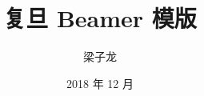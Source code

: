 \documentclass{ctexbeamer}
\title{复旦 Beamer 模版}
\author{梁子龙}
\institute{数学科学学院}
\date{2018 年 12 月}
\begin{document}
  
  \begin{frame}
    \maketitle
  \end{frame}
\end{document}
